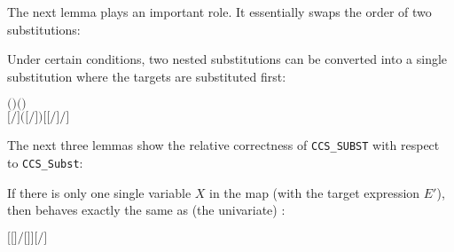 The next lemma plays an important role. It essentially swaps the order of two substitutions:
\begin{lemma}
Under certain conditions, two nested substitutions can be
converted into a single substitution where the targets are substituted first:
\begin{alltt}
\HOLTokenTurnstile{}   \HOLSymConst{\HOLTokenConj{}}   \HOLSymConst{\ensuremath{=}}   \HOLSymConst{\HOLTokenConj{}}   \HOLSymConst{\ensuremath{=}}   \HOLSymConst{\HOLTokenConj{}}
    \ensuremath{(} \ensuremath{)} \ensuremath{(} \ensuremath{)} \HOLSymConst{\HOLTokenImp{}}
   \ensuremath{[}\ensuremath{/}\ensuremath{]} \ensuremath{(}\ensuremath{[}\ensuremath{/}\ensuremath{]} \ensuremath{)} \HOLSymConst{\ensuremath{=}} \ensuremath{[} \ensuremath{[}\ensuremath{/}\ensuremath{]} \ensuremath{/}\ensuremath{]} 
\end{alltt}
\end{lemma}

The next three lemmas show the relative correctness of \texttt{CCS_SUBST}
with respect to \texttt{CCS_Subst}:
\begin{lemma}
  If there is only one single variable $X$ in the map (with the target
  expression $E'$), then  behaves exactly the
  same as (the univariate) :
\begin{alltt}
\HOLTokenTurnstile{} \ensuremath{[}\ensuremath{[}\ensuremath{]}\ensuremath{/}\ensuremath{[}\ensuremath{]}\ensuremath{]}  \HOLSymConst{\ensuremath{=}} \ensuremath{[}\ensuremath{/}\ensuremath{]} 
\end{alltt}
\end{lemma}

